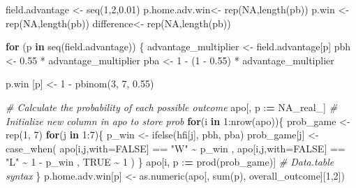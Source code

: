 \documentclass[
]{article}
\newenvironment{Shaded}{\begin{snugshade}}{\end{snugshade}}
\newcommand{\AttributeTok}[1]{\textcolor[rgb]{0.77,0.63,0.00}{#1}}
\newcommand{\CommentTok}[1]{\textcolor[rgb]{0.56,0.35,0.01}{\textit{#1}}}
\newcommand{\ConstantTok}[1]{\textcolor[rgb]{0.00,0.00,0.00}{#1}}
\newcommand{\ControlFlowTok}[1]{\textcolor[rgb]{0.13,0.29,0.53}{\textbf{#1}}}
\newcommand{\DecValTok}[1]{\textcolor[rgb]{0.00,0.00,0.81}{#1}}
\newcommand{\ErrorTok}[1]{\textcolor[rgb]{0.64,0.00,0.00}{\textbf{#1}}}
\newcommand{\FloatTok}[1]{\textcolor[rgb]{0.00,0.00,0.81}{#1}}
\newcommand{\FunctionTok}[1]{\textcolor[rgb]{0.00,0.00,0.00}{#1}}
\newcommand{\NormalTok}[1]{#1}
\newcommand{\OtherTok}[1]{\textcolor[rgb]{0.56,0.35,0.01}{#1}}
\newcommand{\SpecialCharTok}[1]{\textcolor[rgb]{0.00,0.00,0.00}{#1}}
\newcommand{\StringTok}[1]{\textcolor[rgb]{0.31,0.60,0.02}{#1}}
\begin{document}
\begin{Shaded}
\begin{Highlighting}[]
\NormalTok{field.advantage }\OtherTok{\textless{}{-}} \FunctionTok{seq}\NormalTok{(}\DecValTok{1}\NormalTok{,}\DecValTok{2}\NormalTok{,}\FloatTok{0.01}\NormalTok{)}
\NormalTok{p.home.adv.win}\OtherTok{\textless{}{-}} \FunctionTok{rep}\NormalTok{(}\ConstantTok{NA}\NormalTok{,}\FunctionTok{length}\NormalTok{(pb))}
\NormalTok{p.win  }\OtherTok{\textless{}{-}} \FunctionTok{rep}\NormalTok{(}\ConstantTok{NA}\NormalTok{,}\FunctionTok{length}\NormalTok{(pb))}
\NormalTok{difference}\OtherTok{\textless{}{-}} \FunctionTok{rep}\NormalTok{(}\ConstantTok{NA}\NormalTok{,}\FunctionTok{length}\NormalTok{(pb))}


\ControlFlowTok{for}\NormalTok{ (p }\ControlFlowTok{in} \FunctionTok{seq}\NormalTok{(field.advantage)) \{}
\NormalTok{  advantage\_multiplier }\OtherTok{\textless{}{-}}\NormalTok{ field.advantage[p]}
\NormalTok{  pbh }\OtherTok{\textless{}{-}} \FloatTok{0.55} \SpecialCharTok{*}\NormalTok{ advantage\_multiplier}
\NormalTok{  pba }\OtherTok{\textless{}{-}} \DecValTok{1} \SpecialCharTok{{-}}\NormalTok{ (}\DecValTok{1} \SpecialCharTok{{-}} \FloatTok{0.55}\NormalTok{) }\SpecialCharTok{*}\NormalTok{ advantage\_multiplier}

\NormalTok{  p.win [p] }\OtherTok{\textless{}{-}} \DecValTok{1} \SpecialCharTok{{-}} \FunctionTok{pbinom}\NormalTok{(}\DecValTok{3}\NormalTok{, }\DecValTok{7}\NormalTok{, }\FloatTok{0.55}\NormalTok{)}

  \CommentTok{\# Calculate the probability of each possible outcome}
\NormalTok{  apo[, p }\SpecialCharTok{:}\ErrorTok{=} \ConstantTok{NA\_real\_}\NormalTok{] }\CommentTok{\# Initialize new column in apo to store prob}
  \ControlFlowTok{for}\NormalTok{(i }\ControlFlowTok{in} \DecValTok{1}\SpecialCharTok{:}\FunctionTok{nrow}\NormalTok{(apo))\{}
\NormalTok{    prob\_game }\OtherTok{\textless{}{-}} \FunctionTok{rep}\NormalTok{(}\DecValTok{1}\NormalTok{, }\DecValTok{7}\NormalTok{)}
    \ControlFlowTok{for}\NormalTok{(j }\ControlFlowTok{in} \DecValTok{1}\SpecialCharTok{:}\DecValTok{7}\NormalTok{)\{}
\NormalTok{      p\_win }\OtherTok{\textless{}{-}} \FunctionTok{ifelse}\NormalTok{(hfi[j], pbh, pba)}
\NormalTok{      prob\_game[j] }\OtherTok{\textless{}{-}} \FunctionTok{case\_when}\NormalTok{(}
\NormalTok{          apo[i,j,}\AttributeTok{with=}\ConstantTok{FALSE}\NormalTok{] }\SpecialCharTok{==} \StringTok{"W"} \SpecialCharTok{\textasciitilde{}}\NormalTok{ p\_win}
\NormalTok{        , apo[i,j,}\AttributeTok{with=}\ConstantTok{FALSE}\NormalTok{] }\SpecialCharTok{==} \StringTok{"L"} \SpecialCharTok{\textasciitilde{}} \DecValTok{1} \SpecialCharTok{{-}}\NormalTok{ p\_win}
\NormalTok{        , }\ConstantTok{TRUE} \SpecialCharTok{\textasciitilde{}} \DecValTok{1}
\NormalTok{      )}
\NormalTok{    \}}
\NormalTok{  apo[i, p }\SpecialCharTok{:}\ErrorTok{=} \FunctionTok{prod}\NormalTok{(prob\_game)] }\CommentTok{\# Data.table syntax}
\NormalTok{  \}}
\NormalTok{  p.home.adv.win[p] }\OtherTok{\textless{}{-}} \FunctionTok{as.numeric}\NormalTok{(apo[, }\FunctionTok{sum}\NormalTok{(p), overall\_outcome][}\DecValTok{1}\NormalTok{,}\DecValTok{2}\NormalTok{])}
  

\end{Highlighting}
\end{Shaded}
\end{document}
